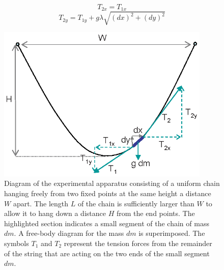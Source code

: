 \documentclass{revtex4}
\begin{document}
\begin{equation}
T_{2x} = T_{1x}
\label{eq:x-equil}
\end{equation}
\begin{equation}
T_{2y} = T_{1y} + g\lambda\sqrt{(dx)^2+(dy)^2}
\label{eq:y-equil}
\end{equation}

\begin{figure}
\includegraphics[width=4in]{catenaryfig.eps}
\caption{\label{catenaryfig}
Diagram of the experimental apparatus consisting of a uniform chain hanging
freely from two fixed points at the same height a distance $W$ apart. The
length $L$ of the chain is sufficiently larger than $W$ to allow it to hang
down a distance $H$ from the end points. The highlighted section indicates
a small segment of the chain of mass $dm$. A free-body diagram for the mass
$dm$ is superimposed. The symbols $T_1$ and $T_2$ represent the tension
forces from the remainder of the string that are acting on the two ends
of the small segment $dm$.}
\end{figure}
\end{document}

